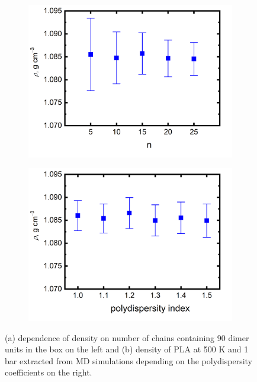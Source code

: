 \begin{figure}[htb!]
	\begin{subfigure}{0.5\textwidth}
		\centering
		\includegraphics[width=1\linewidth]{img/box_90_sim.png}
		\caption{}
		\label{fig:box}
	\end{subfigure}
	\begin{subfigure}{0.5\textwidth}
		\centering
		\includegraphics[width=1\linewidth]{img/polydisperzita.png}
		\caption{}
		\label{fig:polydisperzita}
	\end{subfigure}   	
	\caption{(a) dependence of density on number of chains containing 90 dimer units in the box on the left and (b) density of PLA at 500 K and 1 bar extracted from MD simulations depending on the polydispersity coefficients on the right.}
	\vspace{-0.2cm}
\end{figure}

